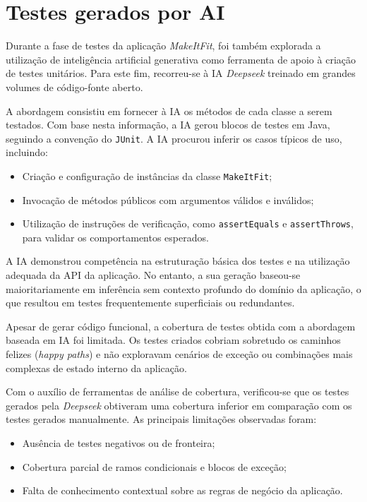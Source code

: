 \documentclass[12pt, a4paper]{article}
\begin{document}
\section{Testes gerados por AI}

Durante a fase de testes da aplicação \textit{MakeItFit}, foi também explorada a utilização de
inteligência artificial generativa como ferramenta de apoio à criação de testes unitários. Para este
fim, recorreu-se à IA \textit{Deepseek} treinado em grandes volumes de código-fonte aberto.

A abordagem consistiu em fornecer à IA os métodos de cada classe a serem testados. Com base nesta
informação, a IA gerou blocos de testes em Java, seguindo a convenção do \texttt{JUnit}. A IA
procurou inferir os casos típicos de uso, incluindo:

\begin{itemize}
  \item Criação e configuração de instâncias da classe \texttt{MakeItFit};
  \item Invocação de métodos públicos com argumentos válidos e inválidos;
  \item Utilização de instruções de verificação, como \texttt{assertEquals} e \texttt{assertThrows},
  para validar os comportamentos esperados.
\end{itemize}

A IA demonstrou competência na estruturação básica dos testes e na utilização adequada da API da
aplicação. No entanto, a sua geração baseou-se maioritariamente em inferência sem contexto profundo
do domínio da aplicação, o que resultou em testes frequentemente superficiais ou redundantes.

Apesar de gerar código funcional, a cobertura de testes obtida com a abordagem baseada em IA foi
limitada. Os testes criados cobriam sobretudo os caminhos felizes (\textit{happy paths}) e não
exploravam cenários de exceção ou combinações mais complexas de estado interno da aplicação.

Com o auxílio de ferramentas de análise de cobertura, verificou-se que os testes gerados pela
\textit{Deepseek} obtiveram uma cobertura inferior em comparação com os testes gerados manualmente.
As principais limitações observadas foram:

\begin{itemize}
  \item Ausência de testes negativos ou de fronteira;
  \item Cobertura parcial de ramos condicionais e blocos de exceção;
  \item Falta de conhecimento contextual sobre as regras de negócio da aplicação.
\end{itemize}
\end{document}
